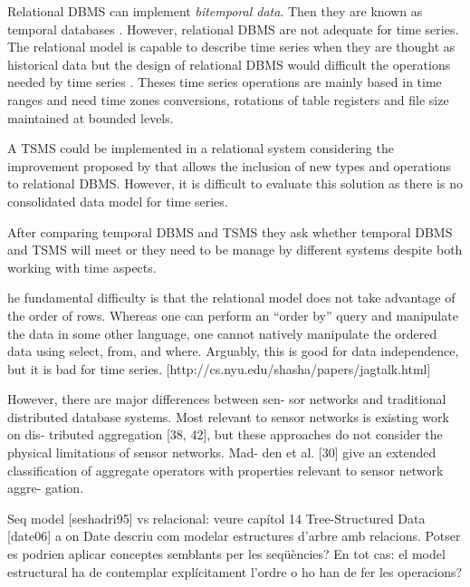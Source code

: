 Relational DBMS can implement \emph{bitemporal data}. Then they are known as temporal databases \parencite[ch.\ 22]{date:introduction}. However, relational DBMS are not adequate for time series. The relational model is capable to describe time series when they are thought as historical data but the design of relational DBMS would difficult the operations  needed by time series \parencite{schmidt95}. Theses time series operations are mainly based in time ranges and need time zones conversions, rotations of table registers and file size maintained at bounded levels.


A TSMS could be implemented in a relational system considering the improvement proposed by \textcite{stonebraker86} that allows the inclusion of new types and operations to relational DBMS. However, it is difficult to evaluate this solution as there is no consolidated data model  for time series. 

After comparing temporal DBMS and TSMS \parencite{schmidt95} they ask whether temporal DBMS and TSMS will meet or they need to be manage by different systems despite both working with time aspects.


he fundamental difficulty is that the relational model does not take advantage of the order of rows. Whereas one can perform an ``order by'' query and manipulate the data in some other language, one cannot natively manipulate the ordered data using select, from, and where. 
Arguably, this is good for data independence, but it is bad for time series.
[http://cs.nyu.edu/shasha/papers/jagtalk.html]

        However, there are major differences between sen-
sor networks and traditional distributed database systems.
Most relevant to sensor networks is existing work on dis-
tributed aggregation [38, 42], but these approaches do not
consider the physical limitations of sensor networks. Mad-
den et al. [30] give an extended classification of aggregate
operators with properties relevant to sensor network aggre-
gation. %


Seq model [seshadri95] vs relacional: veure capítol 14 Tree-Structured Data [date06] a on Date descriu com modelar estructures d'arbre amb relacions. Potser es podrien aplicar conceptes semblants per les seqüències? En tot cas: el model estructural ha de contemplar explícitament l'ordre o ho han de fer les operacions?

